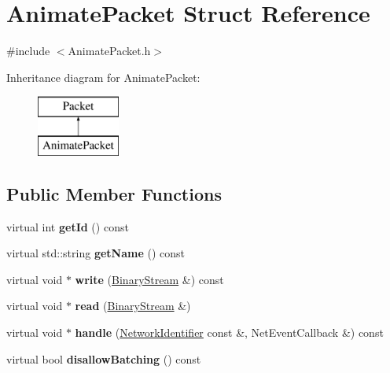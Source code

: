 \hypertarget{struct_animate_packet}{}\section{Animate\+Packet Struct Reference}
\label{struct_animate_packet}


{\ttfamily \#include $<$Animate\+Packet.\+h$>$}

Inheritance diagram for Animate\+Packet\+:\begin{figure}[H]
\begin{center}
\leavevmode
\includegraphics[height=2.000000cm]{struct_animate_packet}
\end{center}
\end{figure}
\subsection*{Public Member Functions}
\begin{DoxyCompactItemize}
\item 
\mbox{\label{struct_animate_packet_a3b763dfe9281d3b9071a4da6bf4519be}} 
virtual int {\bfseries get\+Id} () const
\item 
\mbox{\label{struct_animate_packet_a077c6d7cdfcc9778ba1aa3a720318b46}} 
virtual std\+::string {\bfseries get\+Name} () const
\item 
\mbox{\label{struct_animate_packet_afd3dd7840139c81c8e3fb49f946bedd9}} 
virtual void $\ast$ {\bfseries write} (\mbox{\hyperlink{struct_binary_stream}{Binary\+Stream}} \&) const
\item 
\mbox{\label{struct_animate_packet_ae4cb2391fcfe1185a8d08aa9e4b35b26}} 
virtual void $\ast$ {\bfseries read} (\mbox{\hyperlink{struct_binary_stream}{Binary\+Stream}} \&)
\item 
\mbox{\label{struct_animate_packet_a373b0d3087a3efe47e8f46ce7d7f7d89}} 
virtual void $\ast$ {\bfseries handle} (\mbox{\hyperlink{struct_network_identifier}{Network\+Identifier}} const \&, Net\+Event\+Callback \&) const
\item 
\mbox{\label{struct_animate_packet_a575a5559423083d41d3fef010413b7dd}} 
virtual bool {\bfseries disallow\+Batching} () const
\end{DoxyCompactItemize}
